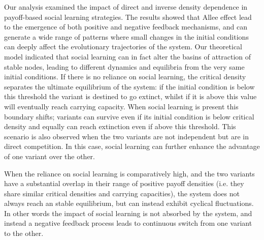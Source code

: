 \documentclass[review,authoryear]{elsarticle}
\begin{document}
Our analysis examined the impact of direct and inverse density dependence in payoff-based social learning strategies. The results showed that Allee effect lead to the emergence of both positive and negative feedback mechanisms, and can generate a wide range of patterns where small changes in the initial conditions can deeply affect the evolutionary trajectories of the system. Our theoretical model indicated that social learning can in fact alter the basins of attraction of stable nodes, leading to different dynamics and equilibria from the very same initial conditions. If there is no reliance on social learning, the critical density separates the ultimate equilibrium of the system: if the initial condition is below this threshold the variant is destined to go extinct, whilst if it is above this value will eventually reach carrying capacity. When social learning is present this boundary shifts; variants can survive even if its initial condition is below critical density and equally can reach extinction even if above this threshold. This scenario is also observed when the two variants are not independent but are in direct competition. In this case, social learning can further enhance the advantage of one variant over the other. 

When the reliance on social learning is comparatively high, and the two variants have a substantial overlap in their range of positive payoff densities (i.e. they share similar critical densities and carrying capacities), the system does not always reach an stable equilibrium, but can instead exhibit cyclical fluctuations. In other words the impact of social learning is not absorbed by the system, and instead a negative feedback process leads to continuous switch from one variant to the other. 
\end{document}
